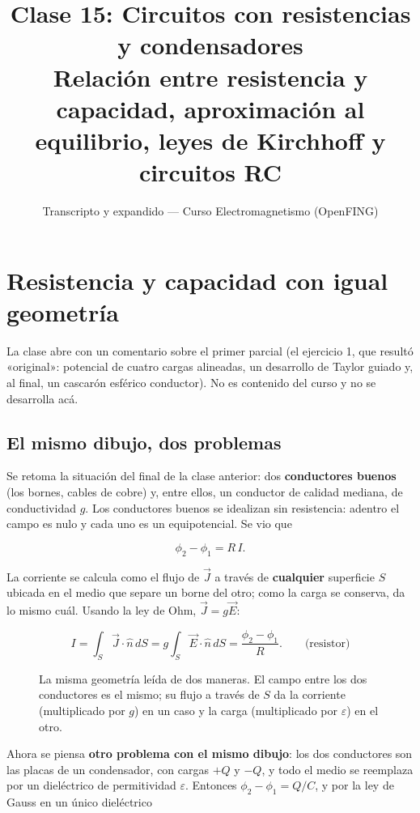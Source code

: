 \documentclass[12pt,a4paper]{article}
\title{\textbf{Clase 15: Circuitos con resistencias y condensadores} \\[0.3em]
        \large{Relación entre resistencia y capacidad, aproximación al equilibrio, leyes de Kirchhoff y circuitos RC}}
\author{Transcripto y expandido --- Curso Electromagnetismo (OpenFING)}
\date{}
\begin{document}
\maketitle
\thispagestyle{empty}
\newpage

\tableofcontents
\newpage

\section{Resistencia y capacidad con igual geometría}

La clase abre con un comentario sobre el primer parcial (el ejercicio 1, que
resultó «original»: potencial de cuatro cargas alineadas, un desarrollo de
Taylor guiado y, al final, un cascarón esférico conductor). No es contenido del
curso y no se desarrolla acá.

\subsection{El mismo dibujo, dos problemas}

Se retoma la situación del final de la clase anterior: dos \textbf{conductores
buenos} (los bornes, cables de cobre) y, entre ellos, un conductor de calidad
mediana, de conductividad $g$. Los conductores buenos se idealizan sin
resistencia: adentro el campo es nulo y cada uno es un equipotencial. Se vio que

\[
\phi_2 - \phi_1 = R\,I .
\]

La corriente se calcula como el flujo de $\vec J$ a través de \textbf{cualquier}
superficie $S$ ubicada en el medio que separe un borne del otro; como la carga
se conserva, da lo mismo cuál. Usando la ley de Ohm, $\vec J = g\vec E$:

\[
I = \int_S \vec J\cdot\hat n\,dS = g\int_S \vec E\cdot\hat n\,dS
= \frac{\phi_2-\phi_1}{R} .
\qquad\text{(resistor)}
\]

\begin{figure}[H]
  \centering
  
  \caption{La misma geometría leída de dos maneras. El campo entre los dos conductores es el mismo; su flujo a través de $S$ da la corriente (multiplicado por $g$) en un caso y la carga (multiplicado por $\varepsilon$) en el otro.}
\end{figure}

Ahora se piensa \textbf{otro problema con el mismo dibujo}: los dos conductores son
las placas de un condensador, con cargas $+Q$ y $-Q$, y todo el medio se
reemplaza por un dieléctrico de permitividad $\varepsilon$. Entonces
$\phi_2 - \phi_1 = Q/C$, y por la ley de Gauss en un único dieléctrico
\end{document}
